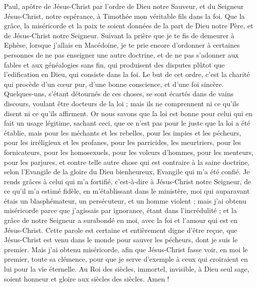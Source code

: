 \begin{multicols}{2}
\TextTitle{[Introduction]}
\VerseOne{}Paul, apôtre de Jésus-Christ par l’ordre de Dieu notre Sauveur, et du Seigneur Jésus-Christ, notre espérance,
à Timothée mon véritable fils dans la foi. Que la grâce, la miséricorde et la paix te soient données de la part de Dieu notre Père, et de Jésus-Christ notre Seigneur.
Suivant la prière que je te fis de demeurer à Ephèse, lorsque j'allais en Macédoine, je te prie encore d'ordonner à certaines personnes de ne pas enseigner une autre doctrine,
et de ne pas s’adonner aux fables et aux généalogies sans fin, qui produisent des disputes plûtot que l'edification en Dieu, qui consiste dans la foi.
Le but de cet ordre, c’est la charité qui procède d'un cœur pur, d'une bonne conscience, et d'une foi sincère.
Quelques-uns, s'étant détournés de ces choses, se sont écartés dans de vains discours,
voulant être docteurs de la loi ; mais ils ne comprennent ni ce qu’ils disent ni ce qu’ils affirment.
Or nous savons que la loi est bonne pour celui qui en fait un usage légitime,
sachant ceci, que ce n’est pas pour le juste que la loi a été établie, mais pour les méchants et les rebelles, pour les impies et les pécheurs, pour les irréligieux et les profanes, pour les parricides, les meurtriers,
pour les fornicateurs, pour les homosexuels, pour les voleurs d’hommes, pour les menteurs, pour les parjures, et contre telle autre chose qui est contraire à la saine doctrine,
selon l'Evangile de la gloire du Dieu bienheureux, Evangile qui m'a été confié.
Je rends grâces à celui qui m'a fortifié, c'est-à-dire à Jésus-Christ notre Seigneur, de ce qu'il m'a estimé fidèle, en m’établissant dans le ministère,
moi qui auparavant étais un blasphémateur, un persécuteur, et un homme violent ; mais j'ai obtenu miséricorde parce que j’agissais par ignorance, étant dans l’incrédulité ;
et la grâce de notre Seigneur a surabondé en moi, avec la foi et l'amour qui est en Jésus-Christ.
Cette parole est certaine et entièrement digne d'être reçue, que Jésus-Christ est venu dans le monde pour sauver les pécheurs, dont je suis le premier.
Mais j'ai obtenu miséricorde, afin que Jésus-Christ fasse voir, en moi le premier, toute sa clémence, pour que je serve d'exemple à ceux qui croiraient en lui pour la vie éternelle.
Au Roi des siècles, immortel, invisible, à Dieu seul sage, soient honneur et gloire aux siècles des siècles. Amen !

\end{multicols}
